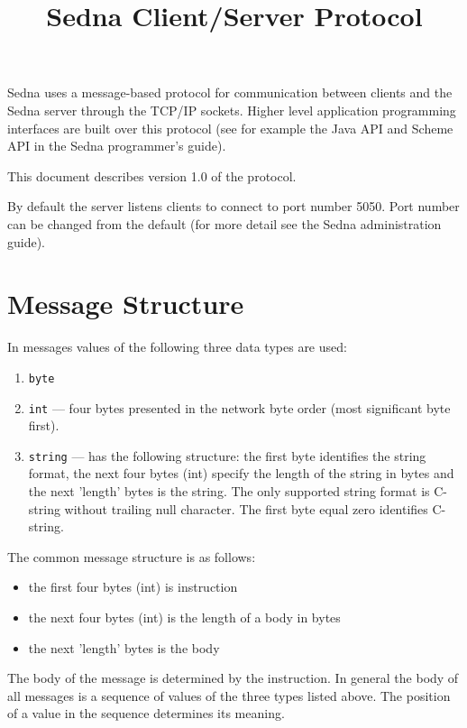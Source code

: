 \documentclass[a4paper,12pt]{article}
\title{Sedna Client/Server Protocol}
\date{}
\newcommand{\TocAt}[6]{}
\begin{document}
\maketitle

\TocAt*{section,subsection,subsubsection}
\TocAt*{subsection,subsubsection}

\tableofcontents


Sedna uses a message-based protocol for communication between clients and the Sedna server through the TCP/IP sockets. Higher level application programming interfaces are built over this protocol (see for example the Java API and Scheme API in the Sedna programmer's guide).

This document describes version 1.0 of the protocol. 

By default the server listens clients to connect to port number 5050. Port number can be changed from the default (for more detail see the Sedna administration guide).


\section{Message Structure}
In messages values of the following three data types are used:
\begin{enumerate}
\item \verb!byte!
\item \verb!int! --- four bytes presented in the network byte order (most significant byte first).
\item \verb!string! --- has the following structure: the first byte identifies the string format, the next four bytes (int) specify the length of the string in bytes and the next 'length' bytes is the string. The only supported string format is C-string without trailing null character. The first byte equal zero identifies C-string. 
\end{enumerate}

The common message structure is as follows:
\begin{itemize} 
\item the first four bytes (int) is instruction 
\item the next four bytes (int) is the length of a body in bytes
\item the next 'length' bytes is the body 
\end{itemize} 

The body of the message is determined by the instruction. In general the body of all messages is a sequence of values of the three types listed above. The position of a value in the sequence determines its meaning. 
\end{document}

